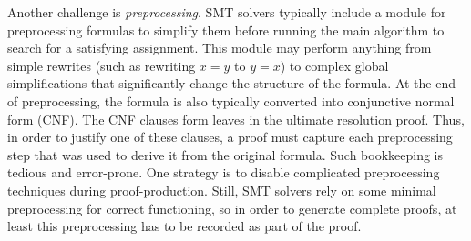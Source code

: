 \documentclass{llncs}
\begin{document}
Another challenge is \emph{preprocessing}.  SMT solvers typically include a
module for preprocessing formulas to simplify them before running the main
algorithm to search for a satisfying assignment.  This module may perform
anything from simple rewrites (such as rewriting $x=y$ to $y=x$) to complex
global simplifications that significantly change the structure of the formula.
At the end of preprocessing, the formula is also typically converted into
conjunctive normal form (CNF).  The CNF clauses form leaves in the ultimate
resolution proof.  Thus, in order to justify one of these clauses, a proof must
capture each preprocessing step that was used to derive it from the original
formula.  Such bookkeeping is tedious and error-prone.  One strategy is to
disable complicated preprocessing techniques during proof-production.  Still,
SMT solvers rely on some minimal preprocessing for correct functioning, so in
order to generate complete proofs, at least this preprocessing has to be
recorded as part of the proof.








\end{document}
